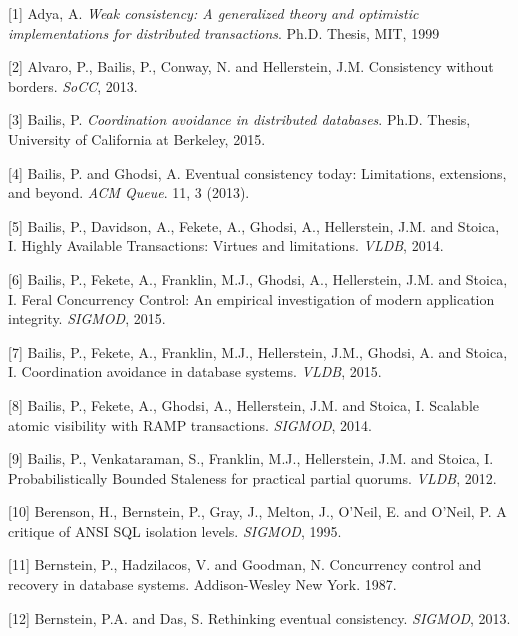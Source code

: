 \documentclass[b5paper,11pt,twoside,openright]{book}
\begin{document}
\leavevmode\hypertarget{ref-adya-phd}{}%
{[}1{]} Adya, A. \emph{Weak consistency: A generalized theory and
  optimistic implementations for distributed transactions}. Ph.D. Thesis,
MIT, 1999

\leavevmode\hypertarget{ref-consistency-borders}{}%
{[}2{]} Alvaro, P., Bailis, P., Conway, N. and Hellerstein, J.M.
Consistency without borders. \emph{SoCC}, 2013.

\leavevmode\hypertarget{ref-bailis-phd}{}%
{[}3{]} Bailis, P. \emph{Coordination avoidance in distributed
  databases}. Ph.D. Thesis, University of California at Berkeley, 2015.

\leavevmode\hypertarget{ref-ec-queue}{}%
{[}4{]} Bailis, P. and Ghodsi, A. Eventual consistency today:
Limitations, extensions, and beyond. \emph{ACM Queue}. 11, 3 (2013).

\leavevmode\hypertarget{ref-hat-vldb}{}%
{[}5{]} Bailis, P., Davidson, A., Fekete, A., Ghodsi, A., Hellerstein,
J.M. and Stoica, I. Highly Available Transactions: Virtues and
limitations. \emph{VLDB}, 2014.

\leavevmode\hypertarget{ref-feral}{}%
{[}6{]} Bailis, P., Fekete, A., Franklin, M.J., Ghodsi, A., Hellerstein,
J.M. and Stoica, I. Feral Concurrency Control: An empirical
investigation of modern application integrity. \emph{SIGMOD}, 2015.

\leavevmode\hypertarget{ref-coord-avoid}{}%
{[}7{]} Bailis, P., Fekete, A., Franklin, M.J., Hellerstein, J.M.,
Ghodsi, A. and Stoica, I. Coordination avoidance in database systems.
\emph{VLDB}, 2015.

\leavevmode\hypertarget{ref-ramp}{}%
{[}8{]} Bailis, P., Fekete, A., Ghodsi, A., Hellerstein, J.M. and
Stoica, I. Scalable atomic visibility with RAMP transactions.
\emph{SIGMOD}, 2014.

\leavevmode\hypertarget{ref-pbs}{}%
{[}9{]} Bailis, P., Venkataraman, S., Franklin, M.J., Hellerstein, J.M.
and Stoica, I. Probabilistically Bounded Staleness for practical partial
quorums. \emph{VLDB}, 2012.

\leavevmode\hypertarget{ref-ansi-critique}{}%
{[}10{]} Berenson, H., Bernstein, P., Gray, J., Melton, J., O'Neil, E.
and O'Neil, P. A critique of ANSI SQL isolation levels. \emph{SIGMOD},
1995.

\leavevmode\hypertarget{ref-bernstein-book}{}%
{[}11{]} Bernstein, P., Hadzilacos, V. and Goodman, N. Concurrency
control and recovery in database systems. Addison-Wesley New York. 1987.

\leavevmode\hypertarget{ref-bernstein-tutorial}{}%
{[}12{]} Bernstein, P.A. and Das, S. Rethinking eventual consistency.
\emph{SIGMOD}, 2013.
\end{document}
